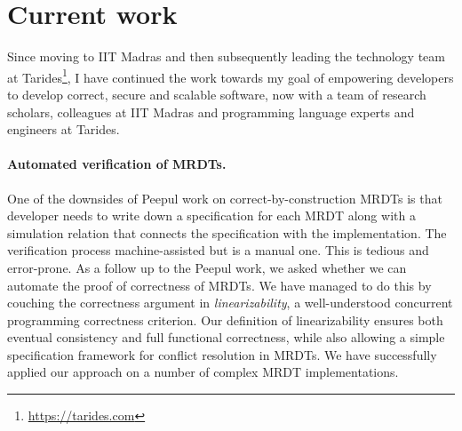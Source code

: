 \documentclass[screen,acmsmall,nonacm]{acmart}
\begin{document}
\section{Current work}

Since moving to IIT Madras and then subsequently leading the technology team at
Tarides\footnote{\url{https://tarides.com}}, I have continued the work towards
my goal of empowering developers to develop correct, secure and scalable
software, now with a team of research scholars, colleagues at IIT Madras and
programming language experts and engineers at Tarides.

\paragraph{\bf Automated verification of MRDTs.} One of the downsides of Peepul
work on correct-by-construction MRDTs is that developer needs to write down a
specification for each MRDT along with a simulation relation that connects the
specification with the implementation. The verification process
machine-assisted but is a manual one. This is tedious and error-prone. As a
follow up to the Peepul work, we asked whether we can automate the proof of
correctness of MRDTs. We have managed to do this by couching the correctness
argument in \emph{linearizability}, a well-understood concurrent programming
correctness criterion. Our definition of linearizability ensures both eventual
consistency and full functional correctness, while also allowing a simple
specification framework for conflict resolution in MRDTs. We have successfully
applied our approach on a number of complex MRDT implementations.
\end{document}
